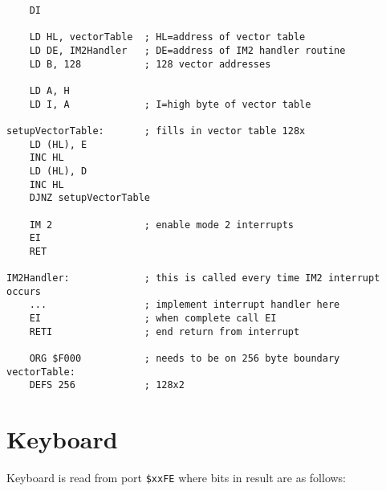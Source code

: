 \documentclass[12pt,twoside,openright,a4paper]{book}
\begin{document}
\begin{Verbatim}
	DI
	
	LD HL, vectorTable  ; HL=address of vector table
	LD DE, IM2Handler   ; DE=address of IM2 handler routine
	LD B, 128           ; 128 vector addresses

	LD A, H
	LD I, A             ; I=high byte of vector table

setupVectorTable:       ; fills in vector table 128x
	LD (HL), E
	INC HL
	LD (HL), D
	INC HL
	DJNZ setupVectorTable 

	IM 2                ; enable mode 2 interrupts
	EI
	RET

IM2Handler:             ; this is called every time IM2 interrupt occurs
	...                 ; implement interrupt handler here
	EI                  ; when complete call EI
	RETI                ; end return from interrupt

	ORG $F000           ; needs to be on 256 byte boundary
vectorTable:
	DEFS 256            ; 128x2
\end{Verbatim}


\pagebreak
\section{Keyboard}
\label{zx_next_keyboard}


Keyboard is read from port {\tt \$xxFE} where bits in result are as follows:
\end{document}
